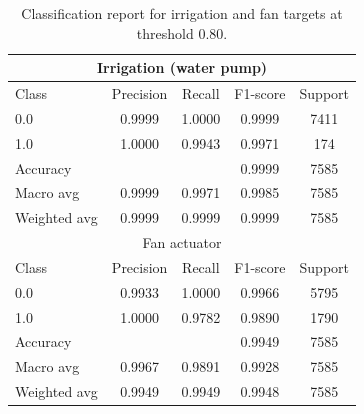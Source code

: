 \documentclass[sn-mathphys,Numbered]{sn-jnl}
\begin{document}
\begin{table}[ht]
    \centering
    \caption{Classification report for irrigation and fan targets at threshold 0.80.}
    \label{tab:thr-0.8}
    \begin{tabular}{lcccc}
        \toprule
        \multicolumn{5}{c}{Irrigation (water pump)} \\
        \midrule
        Class & Precision & Recall & F1-score & Support \\
        \midrule
        0.0 & 0.9999 & 1.0000 & 0.9999 & 7411 \\
        1.0 & 1.0000 & 0.9943 & 0.9971 & 174 \\
        \midrule
        Accuracy     &        &        & 0.9999 & 7585 \\
        Macro avg    & 0.9999 & 0.9971 & 0.9985 & 7585 \\
        Weighted avg & 0.9999 & 0.9999 & 0.9999 & 7585 \\
        \midrule
        \multicolumn{5}{c}{Fan actuator} \\
        \midrule
        Class & Precision & Recall & F1-score & Support \\
        \midrule
        0.0 & 0.9933 & 1.0000 & 0.9966 & 5795 \\
        1.0 & 1.0000 & 0.9782 & 0.9890 & 1790 \\
        \midrule
        Accuracy     &        &        & 0.9949 & 7585 \\
        Macro avg    & 0.9967 & 0.9891 & 0.9928 & 7585 \\
        Weighted avg & 0.9949 & 0.9949 & 0.9948 & 7585 \\
        \bottomrule
    \end{tabular}
\end{table}
\end{document}
